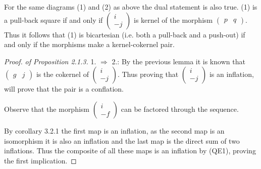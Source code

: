     \begin{corollary}
        For the same diagrams (1) and (2) as above the dual statement is also true. (1) is a pull-back square if and only if $\begin{pmatrix}
            i \\ -j
        \end{pmatrix}$ is kernel of the morphism $\begin{pmatrix}
            p & q
        \end{pmatrix}$. Thus it follows that (1) is bicartesian (i.e. both a pull-back and a push-out) if and only if the morphisms make a kernel-cokernel pair.
    \end{corollary}

    \begin{proof}\emph{of Proposition 2.1.3.} 
        1. $\Rightarrow$ 2.: By the previous lemma it is known that $\begin{pmatrix}
            g & j
        \end{pmatrix}$ is the cokernel of $\begin{pmatrix}
            i \\ -j
        \end{pmatrix}$. Thus proving that $\begin{pmatrix}
            i \\ -j
        \end{pmatrix}$ is an inflation, will prove that the pair is a conflation. 
        
        Observe that the morphism $\begin{pmatrix}
            i \\ -f
        \end{pmatrix}$ can be factored through the sequence. 
        \begin{center}
        \end{center}
        By corollary 3.2.1 the first map is an inflation, as the second map is an isomorphism it is also an inflation and the last map is the direct sum of two inflations. Thus the composite of all these maps is an inflation by (QE1), proving the first implication.


\end{proof}

